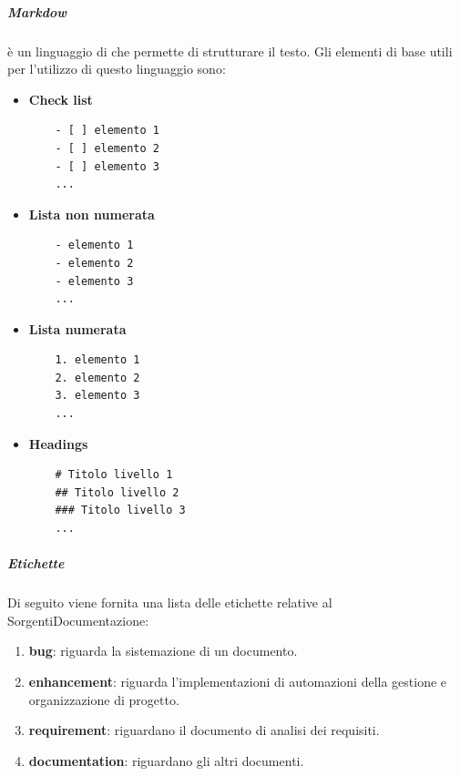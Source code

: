 \subparagraph{Markdow}
\label{subpar:markdown}
 è un linguaggio di  che permette di strutturare il testo.
Gli elementi di base utili per l'utilizzo di questo linguaggio sono:
\begin{itemize}
    \item \textbf{Check list}
    \begin{lstlisting}
    - [ ] elemento 1
    - [ ] elemento 2
    - [ ] elemento 3
    ...
    \end{lstlisting}

    \item \textbf{Lista non numerata}
    \begin{lstlisting}
    - elemento 1
    - elemento 2
    - elemento 3
    ...
    \end{lstlisting}

    \item \textbf{Lista numerata}
    \begin{lstlisting}
    1. elemento 1
    2. elemento 2
    3. elemento 3
    ...
    \end{lstlisting}

    \item \textbf{Headings}
    \begin{lstlisting}
    # Titolo livello 1
    ## Titolo livello 2
    ### Titolo livello 3
    ...
    \end{lstlisting}
    
\end{itemize}

\subparagraph{Etichette}
Di seguito viene fornita una lista delle etichette relative al  SorgentiDocumentazione:
\begin{enumerate}
    \item \textbf{bug}: riguarda la sistemazione di un documento.
    \item \textbf{enhancement}: riguarda l'implementazioni di automazioni della gestione e organizzazione di progetto.
    \item \textbf{requirement}: riguardano il documento di analisi dei requisiti.
    \item \textbf{documentation}: riguardano gli altri documenti.
\end{enumerate}

